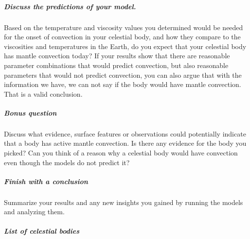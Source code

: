\subparagraph{Discuss the predictions of your model.}
Based on the temperature and viscosity values you determined would be needed for the onset of convection in your celestial body, 
and how they compare to the viscosities and temperatures in the Earth, do you expect that your celestial body has mantle 
convection today? If your results show that there are reasonable parameter combinations that would predict convection, but also reasonable parameters that would not predict convection, you can also argue that with the information we have, we can not say if 
the body would have mantle convection. That is a valid conclusion. 

\subparagraph{Bonus question}
Discuss what evidence, surface features or observations could potentially indicate that a body has active mantle convection. 
Is there any evidence for the body you picked? Can you think of a reason why a celestial body would have convection even though the models do not predict it?

\subparagraph{Finish with a conclusion}
Summarize your results and any new insights you gained by running the models and analyzing them. 

\subparagraph{List of celestial bodies}

